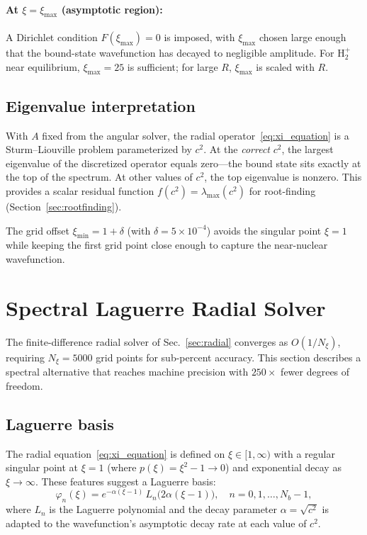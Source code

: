\documentclass[aps,pra,twocolumn,superscriptaddress,longbibliography]{revtex4-2}
\begin{document}
\paragraph{At $\xi = \xi_{\max}$ (asymptotic region):}
A Dirichlet condition $F(\xi_{\max}) = 0$ is imposed, with
$\xi_{\max}$ chosen large enough that the bound-state wavefunction
has decayed to negligible amplitude.  For H$_2^+$ near equilibrium,
$\xi_{\max} = 25$ is sufficient; for large $R$, $\xi_{\max}$ is
scaled with $R$.

\subsection{Eigenvalue interpretation}

With $A$ fixed from the angular solver, the radial
operator~\eqref{eq:xi_equation} is a Sturm--Liouville problem
parameterized by $c^2$.  At the \emph{correct} $c^2$, the largest
eigenvalue of the discretized operator equals zero---the bound state
sits exactly at the top of the spectrum.  At other values of $c^2$,
the top eigenvalue is nonzero.  This provides a scalar residual
function $f(c^2) = \lambda_{\max}(c^2)$ for root-finding
(Section~\ref{sec:rootfinding}).

The grid offset $\xi_{\min} = 1 + \delta$ (with $\delta = 5 \times
10^{-4}$) avoids the singular point $\xi = 1$ while keeping the
first grid point close enough to capture the near-nuclear wavefunction.


\section{Spectral Laguerre Radial Solver}
\label{sec:spectral_radial}

The finite-difference radial solver of Sec.~\ref{sec:radial} converges
as $O(1/N_\xi)$, requiring $N_\xi = 5000$ grid points for sub-percent
accuracy.  This section describes a spectral alternative that reaches
machine precision with $250\times$ fewer degrees of freedom.

\subsection{Laguerre basis}

The radial equation~\eqref{eq:xi_equation} is defined on
$\xi \in [1, \infty)$ with a regular singular point at $\xi = 1$
(where $p(\xi) = \xi^2 - 1 \to 0$) and exponential decay as
$\xi \to \infty$.  These features suggest a Laguerre basis:
\begin{equation}
  \varphi_n(\xi) = e^{-\alpha(\xi - 1)}\,L_n\bigl(2\alpha(\xi - 1)\bigr),
  \quad n = 0, 1, \ldots, N_b - 1,
  \label{eq:laguerre_basis}
\end{equation}
where $L_n$ is the Laguerre polynomial and the decay parameter
$\alpha = \sqrt{c^2}$ is adapted to the wavefunction's asymptotic
decay rate at each value of $c^2$.
\end{document}
